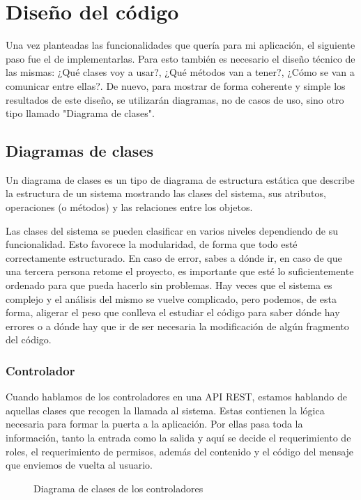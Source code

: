 \section {Diseño del código}

Una vez planteadas las funcionalidades que quería para mi aplicación, el siguiente paso fue el de implementarlas. Para esto también es necesario el diseño técnico de las mismas: ¿Qué clases voy a usar?, ¿Qué métodos van a tener?, ¿Cómo se van a comunicar entre ellas?. De nuevo, para mostrar de forma coherente y simple los resultados de este diseño, se utilizarán diagramas, no de casos de uso, sino otro tipo llamado "Diagrama de clases".

\subsection {Diagramas de clases}

Un diagrama de clases es un tipo de diagrama de estructura estática que describe la estructura de un sistema mostrando las clases del sistema, sus atributos, operaciones (o métodos) y las relaciones entre los objetos.

Las clases del sistema se pueden clasificar en varios niveles dependiendo de su funcionalidad. Esto favorece la modularidad, de forma que todo esté correctamente estructurado. En caso de error, sabes a dónde ir, en caso de que una tercera persona retome el proyecto, es importante que esté lo suficientemente ordenado para que pueda hacerlo sin problemas. Hay veces que el sistema es complejo y el análisis del mismo se vuelve complicado, pero podemos, de esta forma, aligerar el peso que conlleva el estudiar el código para saber dónde hay errores o a dónde hay que ir de ser necesaria la modificación de algún fragmento del código.

\subsubsection {Controlador}

Cuando hablamos de los controladores en una API REST, estamos hablando de aquellas clases que recogen la llamada al sistema. Estas contienen la lógica necesaria para formar la puerta a la aplicación. Por ellas pasa toda la información, tanto la entrada como la salida y aquí se decide el requerimiento de roles, el requerimiento de permisos, además del contenido y el código del mensaje que enviemos de vuelta al usuario.

\begin{figure}[htbp]
	\centerline{}
	\caption{Diagrama de clases de los controladores}
	\label{clases_controlador}
\end{figure}

